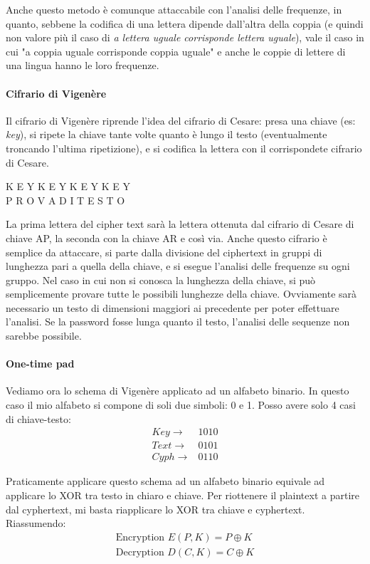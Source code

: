 \noindent Anche questo metodo è comunque attaccabile con l'analisi delle frequenze, in quanto, sebbene la codifica di una lettera dipende dall'altra della coppia (e quindi non valore più il caso di \textit{a lettera uguale corrisponde lettera uguale}), vale il caso in cui "a coppia uguale corrisponde coppia uguale" e anche le coppie di lettere di una lingua hanno le loro frequenze.

\paragraph{Cifrario di Vigenère} Il cifrario di Vigenère riprende l'idea del cifrario di Cesare: presa una chiave (es: \textit{key}), si ripete la chiave tante volte quanto è lungo il testo (eventualmente troncando l'ultima ripetizione), e si codifica la lettera con il corrispondete cifrario di Cesare. 

\noindent
K E Y K E Y K E Y K E Y \\
P R O V A D I T E S T O 
	
\noindent La prima lettera del cipher text sarà la lettera ottenuta dal cifrario di Cesare di chiave AP, la seconda con la chiave AR e così via.
Anche questo cifrario è semplice da attaccare, si parte dalla divisione del ciphertext in gruppi di lunghezza pari a quella della chiave, e si esegue l'analisi delle frequenze su ogni gruppo. Nel caso in cui non si conosca la lunghezza della chiave, si può semplicemente provare tutte le possibili lunghezze della chiave. Ovviamente sarà necessario un testo di dimensioni maggiori ai precedente per poter effettuare l'analisi. Se la password fosse lunga quanto il testo, l'analisi delle sequenze non sarebbe possibile.
	
\paragraph{One-time pad} Vediamo ora lo schema di Vigenère applicato ad un alfabeto binario. In questo caso il mio alfabeto si compone di soli due simboli: 0 e 1. Posso avere solo 4 casi di chiave-testo:
\begin{align*}
Key \rightarrow & 1 0 1 0 \\
Text \rightarrow & 0 1 0 1 \\
Cyph \rightarrow & 0 1 1 0 
\end{align*}

\noindent Praticamente applicare questo schema ad un alfabeto binario equivale ad applicare lo XOR tra testo in chiaro e chiave. Per riottenere il plaintext a partire dal cyphertext, mi basta riapplicare lo XOR tra chiave e cyphertext. Riassumendo:
\begin{align*}
    \text{Encryption } E(P, K) = P  \oplus K\\
    \text{Decryption } D(C, K) = C  \oplus K
\end{align*}

